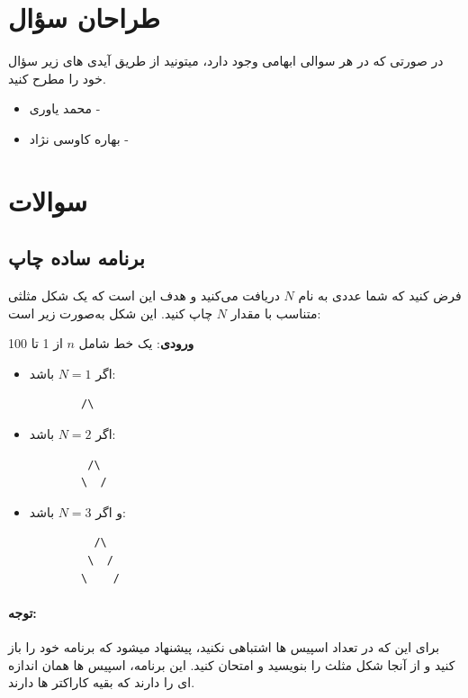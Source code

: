 \documentclass{article}
\begin{document}
\section{طراحان سؤال}
در صورتی که در هر سوالی ابهامی وجود دارد، میتونید از طریق آیدی های زیر سؤال خود را
مطرح کنید.

\begin{itemize}
    \item محمد یاوری - 

    \item بهاره کاوسی نژاد - 
\end{itemize}

\pagebreak

\section{سوالات}

\subsection{برنامه ساده چاپ}
فرض کنید که شما عددی به نام \( N \) دریافت می‌کنید و هدف این است که یک شکل مثلثی متناسب با مقدار \( N \) چاپ کنید. این شکل به‌صورت زیر است:

\textbf{ورودی}: یک خط شامل \( n \) از 1 تا 100

\begin{itemize}
    \item اگر \( N = 1 \) باشد:
    \begin{verbatim}
        /\
    \end{verbatim}
    \item اگر \( N = 2 \) باشد:
    \begin{verbatim}
         /\
        \  /
    \end{verbatim}
    \item و اگر \( N = 3 \) باشد:
    \begin{verbatim}
          /\
         \  /
        \    /
    \end{verbatim}
\end{itemize}

\paragraph{توجه:} برای این که در تعداد اسپیس ها اشتباهی نکنید، پیشنهاد میشود که برنامه  خود را باز کنید و از آنجا شکل مثلث را بنویسید و امتحان کنید. این برنامه، اسپیس ها همان اندازه ای را دارند که بقیه کاراکتر ها دارند.
\end{document}
